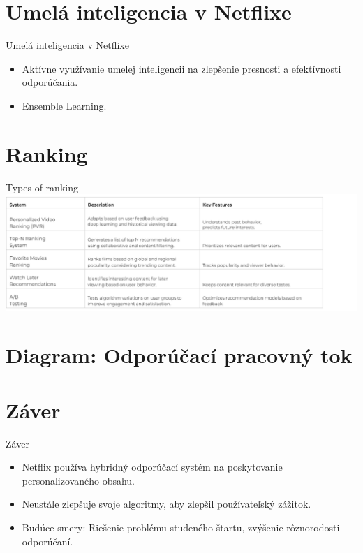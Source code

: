 \documentclass{beamer}
\begin{document}
\section{Umelá inteligencia v Netflixe}

\begin{frame}{Umelá inteligencia v Netflixe}
    \begin{itemize}
        \item Aktívne využívanie umelej inteligencii na zlepšenie presnosti a efektívnosti odporúčania.
        \item Ensemble Learning.
    \end{itemize}
\end{frame}

\section{Ranking}

\begin{frame}{Types of ranking}
    \includegraphics[scale=0.5]{Images_tables/table.png}
\end{frame}

\section{Diagram: Odporúčací pracovný tok}

\section{Záver}

\begin{frame}{Záver}
    \begin{itemize}
        \item Netflix používa hybridný odporúčací systém na poskytovanie personalizovaného obsahu.
        \item Neustále zlepšuje svoje algoritmy, aby zlepšil používateľský zážitok.
        \item Budúce smery: Riešenie problému studeného štartu, zvýšenie rôznorodosti odporúčaní.
    \end{itemize}
\end{frame}
\end{document}

